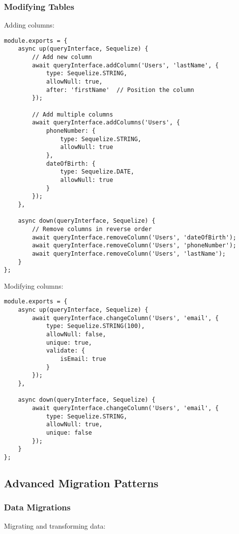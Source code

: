 \documentclass[12pt,a4paper]{book}
\begin{document}
	\subsubsection{Modifying Tables}
	\begin{tcolorbox}[title=Table Modification Migration]
		Adding columns:
		
		\begin{verbatim}
module.exports = {
	async up(queryInterface, Sequelize) {
		// Add new column
		await queryInterface.addColumn('Users', 'lastName', {
			type: Sequelize.STRING,
			allowNull: true,
			after: 'firstName'  // Position the column
		});
		
		// Add multiple columns
		await queryInterface.addColumns('Users', {
			phoneNumber: {
				type: Sequelize.STRING,
				allowNull: true
			},
			dateOfBirth: {
				type: Sequelize.DATE,
				allowNull: true
			}
		});
	},
	
	async down(queryInterface, Sequelize) {
		// Remove columns in reverse order
		await queryInterface.removeColumn('Users', 'dateOfBirth');
		await queryInterface.removeColumn('Users', 'phoneNumber');
		await queryInterface.removeColumn('Users', 'lastName');
	}
};
		\end{verbatim}
		
		Modifying columns:
		
		\begin{verbatim}
module.exports = {
	async up(queryInterface, Sequelize) {
		await queryInterface.changeColumn('Users', 'email', {
			type: Sequelize.STRING(100),
			allowNull: false,
			unique: true,
			validate: {
				isEmail: true
			}
		});
	},
	
	async down(queryInterface, Sequelize) {
		await queryInterface.changeColumn('Users', 'email', {
			type: Sequelize.STRING,
			allowNull: true,
			unique: false
		});
	}
};
		\end{verbatim}
	\end{tcolorbox}
	
	\subsection{Advanced Migration Patterns}
	
	\subsubsection{Data Migrations}
		Migrating and transforming data:
		
\end{document}
